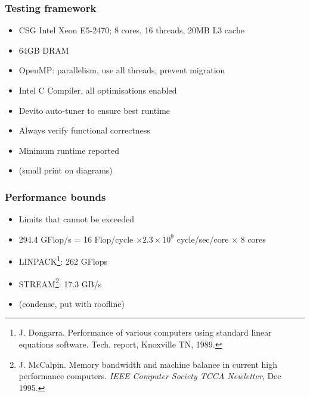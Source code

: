 \documentclass{beamer}
\begin{document}
\begin{frame}
\frametitle{Testing framework}

\begin{itemize}
	\item CSG Intel Xeon E5-2470; 8 cores, 16 threads, 20MB L3 cache
	\item 64GB DRAM
	\item OpenMP: parallelism, use all threads, prevent migration
	\item Intel C Compiler, all optimisations enabled
	\item Devito auto-tuner to ensure best runtime
	\item Always verify functional correctness
	\item Minimum runtime reported
	\item (small print on diagrams)
\end{itemize}
\end{frame}



\begin{frame}
\frametitle{Performance bounds}

\begin{itemize}
	\item Limits that cannot be exceeded
	\item 294.4 GFlop/s = 16 Flop/cycle \(\times 2.3 \times 10^9\) cycle/sec/core \(\times\) 8 cores
	\item LINPACK\footnote{J. Dongarra. Performance of various computers using standard linear equations software. Tech. report, Knoxville TN, 1989.}: 262 GFlops
	\item STREAM\footnote{J. McCalpin. Memory bandwidth and machine balance in current high performance computers. \emph{IEEE Computer Society TCCA Newletter}, Dec 1995.}: 17.3 GB/s
	\item (condense, put with roofline)
\end{itemize}
\end{frame}
\end{document}
